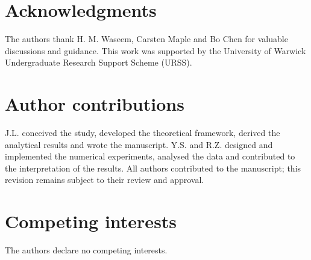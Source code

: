 \documentclass[a4paper,onecolumn,11pt,unpublished]{quantumarticle}
\theoremstyle{remark}
\begin{document}
\section*{Acknowledgments}
The authors thank H. M. Waseem, Carsten Maple and Bo Chen for valuable discussions and guidance. This work was supported by the University of Warwick Undergraduate Research Support Scheme (URSS).

\section*{Author contributions}
J.L. conceived the study, developed the theoretical framework, derived the analytical results and wrote the manuscript. Y.S. and R.Z. designed and implemented the numerical experiments, analysed the data and contributed to the interpretation of the results. All authors contributed to the manuscript; this revision remains subject to their review and approval.

\section*{Competing interests}
The authors declare no competing interests.
\end{document}

